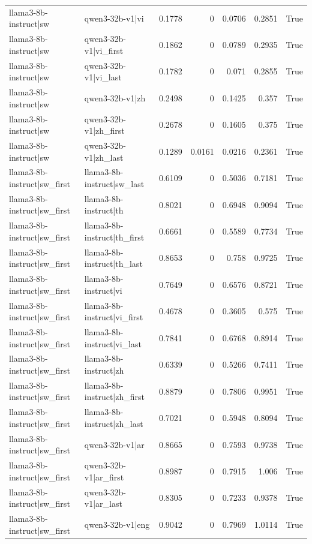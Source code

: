 \begin{table}
\begin{tabular}{l l r r r r l}
llama3-8b-instruct|sw & qwen3-32b-v1|vi & 0.1778 & 0 & 0.0706 & 0.2851 & True \\
llama3-8b-instruct|sw & qwen3-32b-v1|vi_first & 0.1862 & 0 & 0.0789 & 0.2935 & True \\
llama3-8b-instruct|sw & qwen3-32b-v1|vi_last & 0.1782 & 0 & 0.071 & 0.2855 & True \\
llama3-8b-instruct|sw & qwen3-32b-v1|zh & 0.2498 & 0 & 0.1425 & 0.357 & True \\
llama3-8b-instruct|sw & qwen3-32b-v1|zh_first & 0.2678 & 0 & 0.1605 & 0.375 & True \\
llama3-8b-instruct|sw & qwen3-32b-v1|zh_last & 0.1289 & 0.0161 & 0.0216 & 0.2361 & True \\
llama3-8b-instruct|sw_first & llama3-8b-instruct|sw_last & 0.6109 & 0 & 0.5036 & 0.7181 & True \\
llama3-8b-instruct|sw_first & llama3-8b-instruct|th & 0.8021 & 0 & 0.6948 & 0.9094 & True \\
llama3-8b-instruct|sw_first & llama3-8b-instruct|th_first & 0.6661 & 0 & 0.5589 & 0.7734 & True \\
llama3-8b-instruct|sw_first & llama3-8b-instruct|th_last & 0.8653 & 0 & 0.758 & 0.9725 & True \\
llama3-8b-instruct|sw_first & llama3-8b-instruct|vi & 0.7649 & 0 & 0.6576 & 0.8721 & True \\
llama3-8b-instruct|sw_first & llama3-8b-instruct|vi_first & 0.4678 & 0 & 0.3605 & 0.575 & True \\
llama3-8b-instruct|sw_first & llama3-8b-instruct|vi_last & 0.7841 & 0 & 0.6768 & 0.8914 & True \\
llama3-8b-instruct|sw_first & llama3-8b-instruct|zh & 0.6339 & 0 & 0.5266 & 0.7411 & True \\
llama3-8b-instruct|sw_first & llama3-8b-instruct|zh_first & 0.8879 & 0 & 0.7806 & 0.9951 & True \\
llama3-8b-instruct|sw_first & llama3-8b-instruct|zh_last & 0.7021 & 0 & 0.5948 & 0.8094 & True \\
llama3-8b-instruct|sw_first & qwen3-32b-v1|ar & 0.8665 & 0 & 0.7593 & 0.9738 & True \\
llama3-8b-instruct|sw_first & qwen3-32b-v1|ar_first & 0.8987 & 0 & 0.7915 & 1.006 & True \\
llama3-8b-instruct|sw_first & qwen3-32b-v1|ar_last & 0.8305 & 0 & 0.7233 & 0.9378 & True \\
llama3-8b-instruct|sw_first & qwen3-32b-v1|eng & 0.9042 & 0 & 0.7969 & 1.0114 & True \\

\end{tabular}
\end{table}
